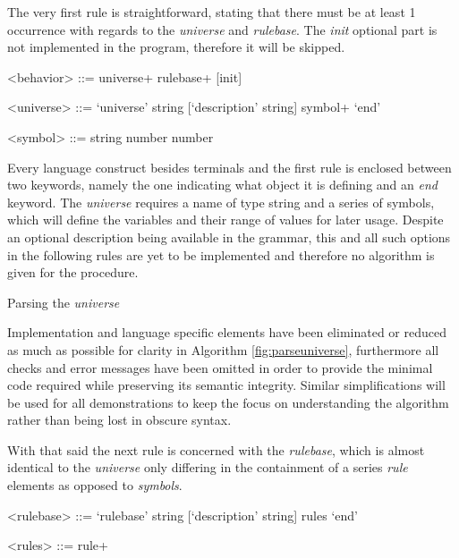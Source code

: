 The very first rule is straightforward, stating that there must be at least 1 occurrence with regards to the \textit{universe} and \textit{rulebase}. The \textit{init} optional part is not implemented in the program, therefore it will be skipped.
\begin{grammar}
<behavior> ::= universe+ rulebase+ [init]

<universe> ::= `universe' string [`description' string] symbol+ `end'

<symbol> ::= string number number
\end{grammar}

Every language construct besides terminals and the first rule is enclosed between two keywords, namely the one indicating what object it is defining and an \textit{end} keyword. The \textit{universe} requires a name of type string and a series of symbols, which will define the variables and their range of values for later usage. Despite an optional description being available in the grammar, this and all such options in the following rules are yet to be implemented and therefore no algorithm is given for the procedure.

\vskip 0.5cm
\begin{algorithm}[H]
\caption{Parsing the \textit{universe}}
\label{fig:parseuniverse}
\end{algorithm}
\vskip 0.5cm

Implementation and language specific elements have been eliminated or reduced as much as possible for clarity in Algorithm \ref{fig:parseuniverse}, furthermore all checks and error messages have been omitted in order to provide the minimal code required while preserving its semantic integrity. Similar simplifications will be used for all demonstrations to keep the focus on understanding the algorithm rather than being lost in obscure syntax.

With that said the next rule is concerned with the \textit{rulebase}, which is almost identical to the \textit{universe} only differing in the containment of a series \textit{rule} elements as opposed to \textit{symbols}.
\begin{grammar}
<rulebase> ::= `rulebase' string [`description' string] rules `end'

<rules> ::= rule+
\end{grammar}

